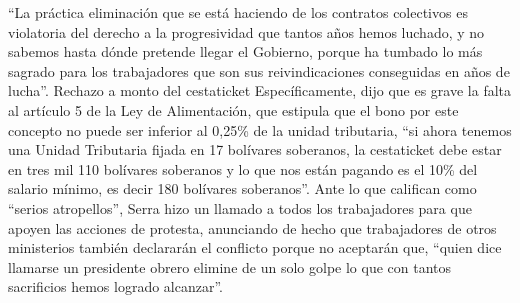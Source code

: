 \documentclass{article}%
\begin{document}
\newline%
%
“La práctica eliminación que se está haciendo de los contratos colectivos es violatoria del derecho a la progresividad que tantos años hemos luchado, y no sabemos hasta dónde pretende llegar el Gobierno, porque ha tumbado lo más sagrado para los trabajadores que son sus reivindicaciones conseguidas en años de lucha”.%
\newline%
%
Rechazo a monto del cestaticket%
\newline%
%
Específicamente, dijo que es grave la falta al artículo 5 de la Ley de Alimentación, que estipula que el bono por este concepto no puede ser inferior al 0,25\% de la unidad tributaria, “si ahora tenemos una Unidad Tributaria fijada en 17 bolívares soberanos, la cestaticket debe estar en tres mil 110 bolívares soberanos y lo que nos están pagando es el 10\% del salario mínimo, es decir 180 bolívares soberanos”.%
\newline%
%
Ante lo que califican como “serios atropellos”, Serra hizo un llamado a todos los trabajadores para que apoyen las acciones de protesta, anunciando de hecho que trabajadores de otros ministerios también declararán el conflicto porque no aceptarán que, “quien dice llamarse un presidente obrero elimine de un solo golpe lo que con tantos sacrificios hemos logrado alcanzar”.%
\newline%
%
\end{document}
